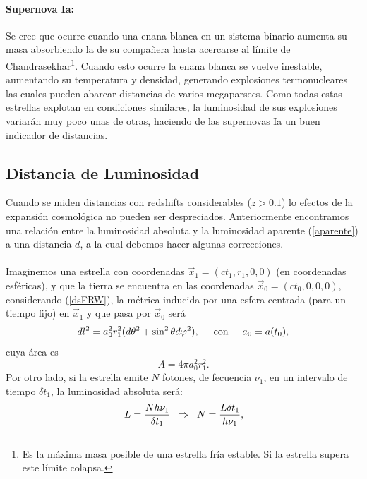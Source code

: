 \paragraph{Supernova Ia:} Se cree que ocurre cuando una enana blanca en un sistema binario aumenta su masa absorbiendo la de su
compañera hasta acercarse al límite de Chandrasekhar\footnote{Es la máxima masa posible de una estrella fría estable. Si la estrella supera este límite  colapsa.}.
Cuando esto ocurre la enana blanca se vuelve inestable, aumentando su temperatura y densidad, generando explosiones
termonucleares las cuales pueden abarcar distancias de varios megaparsecs. Como todas estas estrellas explotan en condiciones
similares, la luminosidad de sus explosiones variarán muy poco unas de otras, haciendo de las supernovas Ia un buen indicador de distancias.
\subsection{Distancia de Luminosidad}
Cuando se miden distancias con redshifts considerables ($z>0.1$) lo efectos de la expansión cosmológica no pueden ser 
despreciados. Anteriormente encontramos una relación entre la luminosidad absoluta y la luminosidad aparente (\ref{aparente})
a una distancia $d$, a la cual debemos hacer algunas correcciones.\\ \\
Imaginemos una estrella con coordenadas $\vec{x}_{1}=(ct_{1},r_{1},0,0)$ (en coordenadas esféricas), y que la tierra
se encuentra en las coordenadas $\vec{x}_{0}=(ct_{0},0,0,0)$, considerando (\ref{dsFRW}), la métrica inducida por una esfera centrada
(para un tiempo fijo) en $\vec{x}_{1}$ y que pasa por $\vec{x}_{0}$ será 
\begin{equation}
 dl^2=a_{0}^2 r_{1}^2(d\theta^2  +\sin^2\theta d\varphi^2),\hspace{0.5cm} \mbox{con} \hspace{0.5cm}  a_{0}= a(t_{0}),
\end{equation}
cuya área es
\begin{equation}
A=4\pi a_{0}^2 r_{1}^2 . 
\end{equation}
Por otro lado, si la estrella emite $N$ fotones, de fecuencia $\nu_{1}$, en un intervalo de tiempo $\delta t_{1}$, la 
luminosidad absoluta será:
\begin{equation} 
L=\frac{N h\nu_{1}}{\delta t_{1}}  \hspace{0.2cm} \Rightarrow \hspace{0.2cm} N=\frac{L\delta t_{1}}{h\nu_{1}},\label{Ltotal}
\end{equation}
